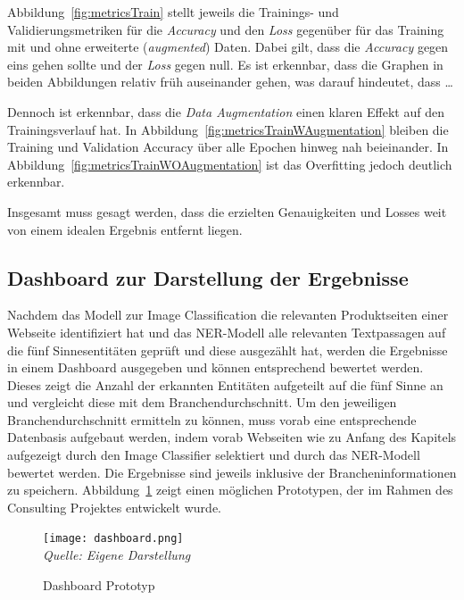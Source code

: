 Abbildung~\ref{fig:metricsTrain} stellt jeweils die Trainings- und Validierungsmetriken für die \textit{Accuracy} und den \textit{Loss} gegenüber für das Training mit und ohne erweiterte (\textit{augmented}) Daten.
Dabei gilt, dass die \textit{Accuracy} gegen eins gehen sollte und der \textit{Loss} gegen null.
Es ist erkennbar, dass die Graphen in beiden Abbildungen relativ früh auseinander gehen, was darauf hindeutet, dass \ldots

Dennoch ist erkennbar, dass die \textit{Data Augmentation} einen klaren Effekt auf den Trainingsverlauf hat. In Abbildung~\ref{fig:metricsTrainWAugmentation} bleiben die Training und Validation Accuracy über alle Epochen hinweg nah beieinander.
In Abbildung~\ref{fig:metricsTrainWOAugmentation} ist das Overfitting jedoch deutlich erkennbar. 

Insgesamt muss gesagt werden, dass die erzielten Genauigkeiten und Losses weit von einem idealen Ergebnis entfernt liegen.

\subsection{Dashboard zur Darstellung der Ergebnisse}\label{subsec_dashboard}
Nachdem das Modell zur Image Classification die relevanten Produktseiten einer Webseite identifiziert hat und das \ac{NER}-Modell
alle relevanten Textpassagen auf die fünf Sinnesentitäten geprüft und diese ausgezählt hat, werden die Ergebnisse
in einem Dashboard ausgegeben und können entsprechend bewertet werden.
Dieses zeigt die Anzahl der erkannten Entitäten aufgeteilt auf die fünf Sinne an und vergleicht diese mit dem Branchendurchschnitt.
Um den jeweiligen Branchendurchschnitt ermitteln zu können, muss vorab eine entsprechende Datenbasis aufgebaut werden,
indem vorab Webseiten wie zu Anfang des Kapitels aufgezeigt durch den Image Classifier selektiert und durch das \ac{NER}-Modell
bewertet werden.
Die Ergebnisse sind jeweils inklusive der Brancheninformationen zu speichern.
Abbildung~\ref{fig:dashboard} zeigt einen möglichen Prototypen, der im Rahmen des Consulting Projektes entwickelt wurde.
\begin{figure}[H]
	\centering
	\caption[]{Dashboard Prototyp}\label{fig:dashboard}
	\texttt{[image: dashboard.png]}
	\\
	\textit{Quelle: Eigene Darstellung}
\end{figure}